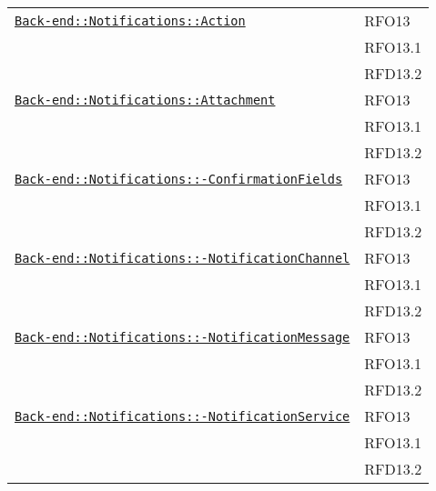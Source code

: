\begin{longtable}{|>{\centering}m{10cm}|m{3cm}<{\centering}|}
\hyperref[Back-end::Notifications::Action]{\texttt{Back-end::Notifications::Action}} & RFO13\\
& RFO13.1\\
& RFD13.2\\ \hline

\hyperref[Back-end::Notifications::Attachment]{\texttt{Back-end::Notifications::Attachment}} & RFO13\\
& RFO13.1\\
& RFD13.2\\ \hline

\hyperref[Back-end::Notifications::ConfirmationFields]{\texttt{Back-end::Notifications::-\linebreak ConfirmationFields}} & RFO13\\
& RFO13.1\\
& RFD13.2\\ \hline

\hyperref[Back-end::Notifications::NotificationChannel]{\texttt{Back-end::Notifications::-\linebreak NotificationChannel}} & RFO13\\
& RFO13.1\\
& RFD13.2\\ \hline

\hyperref[Back-end::Notifications::NotificationMessage]{\texttt{Back-end::Notifications::-\linebreak NotificationMessage}} & RFO13\\
& RFO13.1\\
& RFD13.2\\ \hline

\hyperref[Back-end::Notifications::NotificationService]{\texttt{Back-end::Notifications::-\linebreak NotificationService}} & RFO13\\
& RFO13.1\\
& RFD13.2\\ \hline


\end{longtable}
